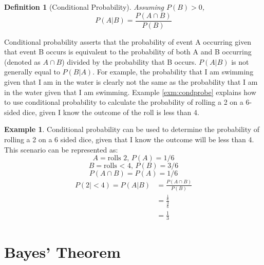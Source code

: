 \documentclass[
  12pt,
  twoside]{book}
\theoremstyle{definition}
\newtheorem{definition}{Definition}[chapter]
\theoremstyle{definition}
\newtheorem{example}{Example}[chapter]
\theoremstyle{definition}
\theoremstyle{remark}
\begin{document}
\begin{definition}[Conditional Probability]
\protect\hypertarget{def:condprob}{}{\label{def:condprob} {} }\emph{Assuming \(P(B)>0\),}
\[P(A|B)=\frac{P(A \cap B)}{P(B)}\]
\end{definition}

Conditional probability asserts that the probability of event A occurring given that event B occurs is equivalent to the probability of both A and B occurring (denoted as \(A \cap B\)) divided by the probability that B occurs. \(P(A|B)\) is not generally equal to \(P(B|A)\).
For example, the probability that I am swimming given that I am in the water is clearly not the same as the probability that I am in the water given that I am swimming.
Example \ref{exm:condprobe} explains how to use conditional probability to calculate the probability of rolling a 2 on a 6-sided dice, given I know the outcome of the roll is less than 4.

\begin{example}
\protect\hypertarget{exm:condprobe}{}{\label{exm:condprobe} }Conditional probability can be used to determine the probability of rolling a 2 on a 6 sided dice, given that I know the outcome will be less than 4. This scenario can be represented as:
\[A = \textrm{rolls 2, } P(A) = 1/6\]
\[B = \textrm{rolls < 4, } P(B) = 3/6\]
\[P(A \cap B) = P(A) = 1/6\]
\[\begin{split}
P(2|<4) = P(A|B) & = \frac{P(A \cap B)}{P(B)} \\
  & = \frac{\frac{1}{6}}{\frac{3}{6}} \\
  & = \frac{1}{3}
\end{split}\]
\end{example}

\hypertarget{bayes-theorem}{%
\section{Bayes' Theorem}\label{bayes-theorem}}
\end{document}
